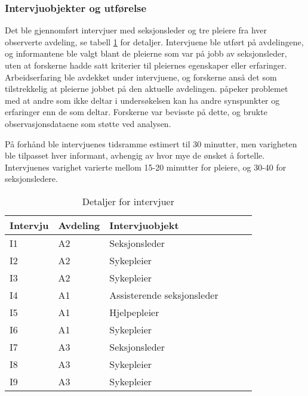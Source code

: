 \subsubsection{Intervjuobjekter og utførelse}
Det ble gjennomført intervjuer med seksjonsleder og tre pleiere fra hver observerte avdeling, se tabell \ref{detaljerintervju} for detaljer. Intervjuene ble utført på avdelingene, og informantene ble valgt blant de pleierne som var på jobb av seksjonsleder, uten at forskerne hadde satt kriterier til pleiernes egenskaper eller erfaringer. Arbeidserfaring ble avdekket under intervjuene, og forskerne anså det som tilstrekkelig at pleierne jobbet på den aktuelle avdelingen. \citet{Tjora} påpeker problemet med at andre som ikke deltar i undersøkelsen kan ha andre synspunkter og erfaringer enn de som deltar. Forskerne var bevisste på dette, og brukte observasjonsdataene som støtte ved analysen.
 
\noindent
På forhånd ble intervjuenes tidsramme estimert til 30 minutter, men varigheten ble tilpasset hver informant, avhengig av hvor mye de ønsket å fortelle. Intervjuenes varighet varierte mellom 15-20 minutter for pleiere, og 30-40 for seksjonsledere.
 
\begin{table}[H]\centering
    \begin{tabular}{ |l|l|l|l|l|l| }
    \hline
    Intervju & Avdeling & Intervjuobjekt \\ \hline
       I1 & A2 & Seksjonsleder \\ \hline
       I2 & A2 & Sykepleier \\ \hline
       I3 & A2 & Sykepleier \\ \hline
       I4 & A1 & Assisterende seksjonsleder \\ \hline
       I5 & A1 & Hjelpepleier \\ \hline
       I6 & A1 & Sykepleier \\ \hline
       I7 & A3 & Seksjonsleder \\ \hline
       I8 & A3 & Sykepleier \\ \hline
       I9 & A3 & Sykepleier \\ \hline
    \end{tabular}
    \caption {Detaljer for intervjuer}
    \label{detaljerintervju}
\end{table}
